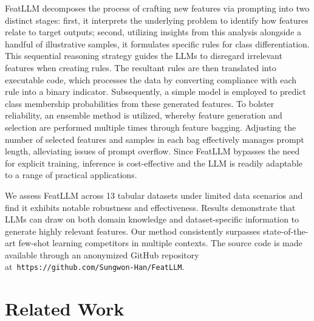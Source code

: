 \textsf{FeatLLM} decomposes the process of crafting new features via prompting into two distinct stages: first, it interprets the underlying problem to identify how features relate to target outputs; second, utilizing insights from this analysis alongside a handful of illustrative samples, it formulates specific rules for class differentiation. This sequential reasoning strategy guides the LLMs to disregard irrelevant features when creating rules. The resultant rules are then translated into executable code, which processes the data by converting compliance with each rule into a binary indicator. Subsequently, a simple model is employed to predict class membership probabilities from these generated features. To bolster reliability, an ensemble method is utilized, whereby feature generation and selection are performed multiple times through feature bagging. Adjusting the number of selected features and samples in each bag effectively manages prompt length, alleviating issues of prompt overflow. Since \textsf{FeatLLM} bypasses the need for explicit training, inference is cost-effective and the LLM is readily adaptable to a range of practical applications.

We assess \textsf{FeatLLM} across 13 tabular datasets under limited data scenarios and find it exhibits notable robustness and effectiveness. Results demonstrate that LLMs can draw on both domain knowledge and dataset-specific information to generate highly relevant features. Our method consistently surpasses state-of-the-art few-shot learning competitors in multiple contexts. The source code is made available through an anonymized GitHub repository at~\texttt{https://github.com/Sungwon-Han/FeatLLM}.

\section{Related Work}


